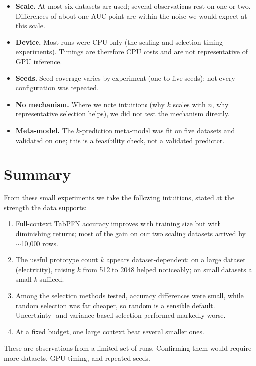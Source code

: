 \documentclass[11pt,a4paper]{article}
\begin{document}
\begin{itemize}
\item \textbf{Scale.} At most six datasets are used; several observations rest
on one or two. Differences of about one AUC point are within the noise we would
expect at this scale.
\item \textbf{Device.} Most runs were CPU-only (the scaling and selection
timing experiments). Timings are therefore CPU costs and are not representative
of GPU inference.
\item \textbf{Seeds.} Seed coverage varies by experiment (one to five seeds);
not every configuration was repeated.
\item \textbf{No mechanism.} Where we note intuitions (why $k$ scales with $n$,
why representative selection helps), we did not test the mechanism directly.
\item \textbf{Meta-model.} The $k$-prediction meta-model was fit on five
datasets and validated on one; this is a feasibility check, not a validated
predictor.
\end{itemize}

\section{Summary}

From these small experiments we take the following intuitions, stated at the
strength the data supports:

\begin{enumerate}
\item Full-context TabPFN accuracy improves with training size but with
diminishing returns; most of the gain on our two scaling datasets arrived by
$\sim$10{,}000 rows.
\item The useful prototype count $k$ appears dataset-dependent: on a large
dataset (electricity), raising $k$ from 512 to 2048 helped noticeably; on small
datasets a small $k$ sufficed.
\item Among the selection methods tested, accuracy differences were small,
while random selection was far cheaper, so random is a sensible default.
Uncertainty- and variance-based selection performed markedly worse.
\item At a fixed budget, one large context beat several smaller ones.
\end{enumerate}

These are observations from a limited set of runs. Confirming them would require
more datasets, GPU timing, and repeated seeds.
\end{document}
